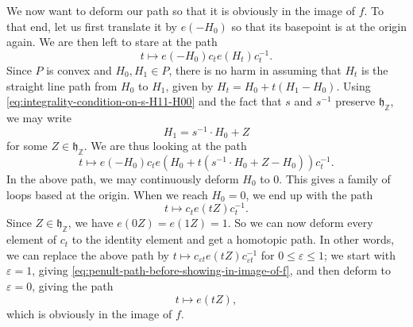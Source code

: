 \documentclass[reqno]{amsart} 
\def\eps{\varepsilon}
\begin{document}
We now want to deform our path so that it is obviously in the image of $f$.  To that end, let us first translate it by $e(-H_0)$ so that its basepoint is at the origin again.  We are then left to stare at the path
\begin{equation*}
  t \mapsto e(-H_0) c_t e(H_t) c_t^{-1}.
\end{equation*}
Since $P$ is convex and $H_0,H_1 \in P$, there is no harm in assuming that $H_t$ is the straight line path from $H_0$ to $H_1$, given by $H_t = H_0 + t(H_1 - H_0)$.  Using \eqref{eq:integrality-condition-on-s-H11-H00} and the fact that $s$ and $s^{-1}$ preserve $\mathfrak{h}_\mathbb{Z}$, we may write
\begin{equation*}
  H_1 = s^{-1} \cdot H_0 + Z
\end{equation*}
for some $Z \in \mathfrak{h}_\mathbb{Z}$.  We are thus looking at the path
\begin{equation*}
  t \mapsto e(-H_0) c_t e(H_0 + t (s^{-1} \cdot H_0 + Z - H_0) ) c_t^{-1}.
\end{equation*}
In the above path, we may continuously deform $H_0$ to $0$.  This gives a family of loops based at the origin.  When we reach $H_0 = 0$, we end up with the path
\begin{equation}\label{eq:penult-path-before-showing-in-image-of-f}
  t \mapsto
  c_t e(t  Z ) c_t^{-1}.
\end{equation}
Since $Z \in \mathfrak{h}_\mathbb{Z}$, we have $e(0 Z) = e(1 Z) = 1$.  So we can now deform every element of $c_t$ to the identity element and get a homotopic path.  In other words, we can replace the above path by $t \mapsto c_{\eps t} e(t Z) c_{\eps t}^{-1}$ for $0 \leq \eps \leq 1$; we start with $\eps = 1$, giving \eqref{eq:penult-path-before-showing-in-image-of-f}, and then deform to $\eps = 0$, giving the path
\begin{equation*}
  t \mapsto e(t Z),
\end{equation*}
which is obviously in the image of $f$.
\end{document}
